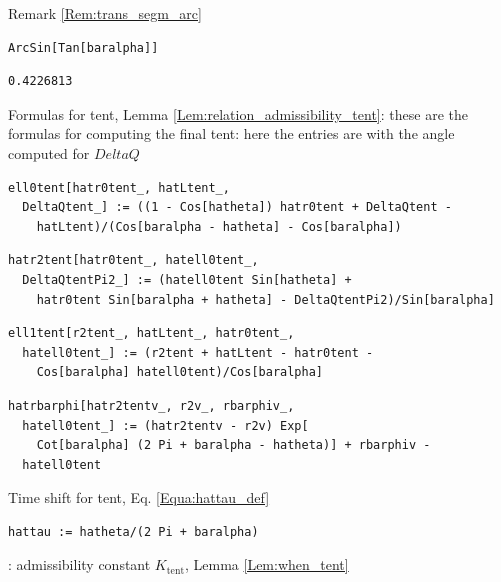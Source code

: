 \documentclass[reqno]{amsart}
\theoremstyle{definition} \newtheorem{definition}{Definition}[section]
\theoremstyle{definition} \newtheorem{remark}[definition]{Remark}
\theoremstyle{plain} \newtheorem{lemma}[definition]{Lemma}
\theoremstyle{plain} \newtheorem{proposition}[definition]{Proposition}
\theoremstyle{plain} \newtheorem{theorem}[definition]{Theorem}
\theoremstyle{plain} \newtheorem{corollary}[definition]{Corollary}
\theoremstyle{definition} \newtheorem{example}[definition]{Example}
\theoremstyle{plain} \newtheorem{claim}[clai]{Claim}
\theoremstyle{definition} \newtheorem{assumption}[definition]{Assumption}
\theoremstyle{definition} \newtheorem{observation}[definition]{Observation}
\newcommand{\1}{\mathbbm 1}
\newcommand{\smed}{\medskip}
\newcommand{\sbig}{\bigskip}
\numberwithin{equation}{section} %
\theoremstyle{plain} \newtheorem*{theorem*}{Theorem}
\theoremstyle{plain} \newtheorem{mthm}[maintheorem]{Main Theorem}
\theoremstyle{plain} \newtheorem*{mthm*}{Main Theorem}
\theoremstyle{plain} \newtheorem*{conjecture*}{Conjecture}
\theoremstyle{plain} \newtheorem{conjecture}[definition]{Conjecture}
\theoremstyle{plain} \newtheorem*{problem*}{Problem}
\begin{document}
\noindent Remark \ref{Rem:trans_segm_arc}
\smed
\begin{verbatim}
ArcSin[Tan[baralpha]]
\end{verbatim}
\begin{verbatim}
0.4226813
\end{verbatim}
\smed
Formulas for tent, Lemma \ref{Lem:relation_admissibility_tent}: these are the formulas for computing the final tent: here the entries are with the angle computed for $DeltaQ$
\smed
\begin{verbatim}
ell0tent[hatr0tent_, hatLtent_, 
  DeltaQtent_] := ((1 - Cos[hatheta]) hatr0tent + DeltaQtent - 
    hatLtent)/(Cos[baralpha - hatheta] - Cos[baralpha])
\end{verbatim}
\begin{verbatim}
hatr2tent[hatr0tent_, hatell0tent_, 
  DeltaQtentPi2_] := (hatell0tent Sin[hatheta] + 
    hatr0tent Sin[baralpha + hatheta] - DeltaQtentPi2)/Sin[baralpha]
\end{verbatim}
\begin{verbatim}
ell1tent[r2tent_, hatLtent_, hatr0tent_, 
  hatell0tent_] := (r2tent + hatLtent - hatr0tent - 
    Cos[baralpha] hatell0tent)/Cos[baralpha]
\end{verbatim}
\begin{verbatim}
hatrbarphi[hatr2tentv_, r2v_, rbarphiv_, 
  hatell0tent_] := (hatr2tentv - r2v) Exp[
    Cot[baralpha] (2 Pi + baralpha - hatheta)] + rbarphiv - 
  hatell0tent
\end{verbatim}
\smed
Time shift for tent, Eq. \eqref{Equa:hattau_def}
\smed
\begin{verbatim}
hattau := hatheta/(2 Pi + baralpha)
\end{verbatim}

\sbig

: admissibility constant $K_\mathrm{tent}$, Lemma \ref{Lem:when_tent}

\sbig
\end{document}
